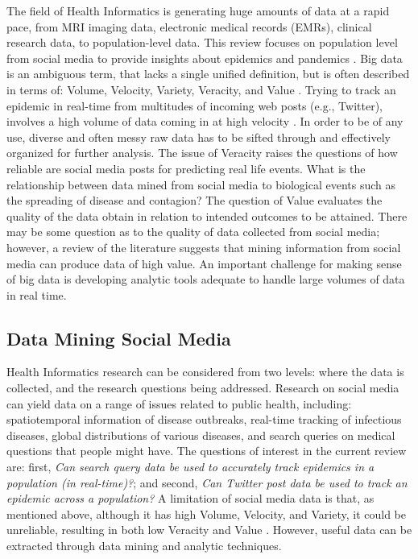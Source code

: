 \documentclass[sigconf]{acmart}
\begin{document}
The field of Health Informatics is generating huge amounts of data at a rapid pace,
from MRI imaging data, electronic medical records (EMRs), clinical research data, to
population-level data. This review focuses on population level from social media to 
provide insights about epidemics and pandemics \cite{hay13, herland14}. Big data is 
an ambiguous term, that lacks a single unified definition, but is often described in 
terms of: Volume, Velocity, Variety, Veracity, and Value \cite{demchenko12}. Trying 
to track an epidemic in real-time from multitudes of incoming web posts (e.g., 
Twitter), involves a high volume of data coming in at high velocity \cite{lamb13, 
paul14}. In order to be of any use, diverse and often messy raw data has to be sifted
through and effectively organized for further analysis. The issue of Veracity raises 
the questions of how reliable are social media posts for predicting real life events.
What is the relationship between data mined from social media to biological events 
such as the spreading of disease and contagion? The question of Value evaluates the 
quality of the data obtain in relation to intended outcomes to be attained. There may
be some question as to the quality of data collected from social media; however, a
review of the literature suggests that mining information from social media can 
produce data of high value. An important challenge for making sense of big data 
is developing analytic tools adequate to handle large volumes of data in real time.

\subsection{Data Mining Social Media}

Health Informatics research can be considered from two levels: where the data 
is collected, and the research questions being addressed. Research on social 
media can yield data on a range of issues related to public health, including: 
spatiotemporal information of disease outbreaks, real-time tracking of infectious
diseases, global distributions of various diseases, and search queries on medical 
questions that people might have. The questions of interest in the current review 
are: first, \textit{Can search query data be used to accurately track epidemics in 
a population (in real-time)?};  and second, \textit{Can Twitter post data be used 
to track an epidemic across a population?} A limitation of social media data is 
that, as mentioned above, although it has high Volume, Velocity, and Variety, it 
could be unreliable, resulting in both low Veracity and Value \cite{hay14, lazer14}. 
However, useful data can be extracted through data mining and analytic techniques. 
\end{document}
